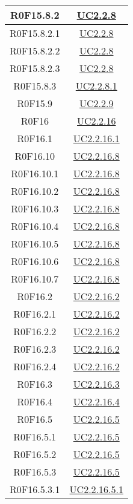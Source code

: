 \documentclass[../AnalisiDeiRequisiti.tex]{subfiles}
\begin{document}
\begin{longtable}{|c|c|}
	R0F15.8.2 & \hyperlink{UC2.2.8}{UC2.2.8}\\\hline
	R0F15.8.2.1 & \hyperlink{UC2.2.8}{UC2.2.8}\\\hline
	R0F15.8.2.2 & \hyperlink{UC2.2.8}{UC2.2.8}\\\hline
	R0F15.8.2.3 & \hyperlink{UC2.2.8}{UC2.2.8}\\\hline
	R0F15.8.3 & \hyperlink{UC2.2.8.1}{UC2.2.8.1}\\\hline
	R0F15.9 & \hyperlink{UC2.2.9}{UC2.2.9}\\\hline
	R0F16 & \hyperlink{UC2.2.16}{UC2.2.16}\\\hline
	R0F16.1 & \hyperlink{UC2.2.16.1}{UC2.2.16.1}\\\hline
	R0F16.10 & \hyperlink{UC2.2.16.8}{UC2.2.16.8}\\\hline
	R0F16.10.1 & \hyperlink{UC2.2.16.8}{UC2.2.16.8}\\\hline
	R0F16.10.2 & \hyperlink{UC2.2.16.8}{UC2.2.16.8}\\\hline
	R0F16.10.3 & \hyperlink{UC2.2.16.8}{UC2.2.16.8}\\\hline
	R0F16.10.4 & \hyperlink{UC2.2.16.8}{UC2.2.16.8}\\\hline
	R0F16.10.5 & \hyperlink{UC2.2.16.8}{UC2.2.16.8}\\\hline
	R0F16.10.6 & \hyperlink{UC2.2.16.8}{UC2.2.16.8}\\\hline
	R0F16.10.7 & \hyperlink{UC2.2.16.8}{UC2.2.16.8}\\\hline
	R0F16.2 & \hyperlink{UC2.2.16.2}{UC2.2.16.2}\\\hline
	R0F16.2.1 & \hyperlink{UC2.2.16.2}{UC2.2.16.2}\\\hline
	R0F16.2.2 & \hyperlink{UC2.2.16.2}{UC2.2.16.2}\\\hline
	R0F16.2.3 & \hyperlink{UC2.2.16.2}{UC2.2.16.2}\\\hline
	R0F16.2.4 & \hyperlink{UC2.2.16.2}{UC2.2.16.2}\\\hline
	R0F16.3 & \hyperlink{UC2.2.16.3}{UC2.2.16.3}\\\hline
	R0F16.4 & \hyperlink{UC2.2.16.4}{UC2.2.16.4}\\\hline
	R0F16.5 & \hyperlink{UC2.2.16.5}{UC2.2.16.5}\\\hline
	R0F16.5.1 & \hyperlink{UC2.2.16.5}{UC2.2.16.5}\\\hline
	R0F16.5.2 & \hyperlink{UC2.2.16.5}{UC2.2.16.5}\\\hline
	R0F16.5.3 & \hyperlink{UC2.2.16.5}{UC2.2.16.5}\\\hline
	R0F16.5.3.1 & \hyperlink{UC2.2.16.5.1}{UC2.2.16.5.1}\\\hline

\end{longtable}
\end{document}
